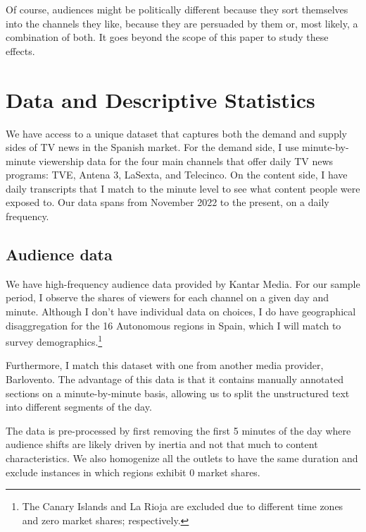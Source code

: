\documentclass[12pt]{article}
\begin{document}
	
	
	Of course, audiences might be politically different because they sort themselves into the channels they like, because they are persuaded by them or, most likely, a combination of both. It goes beyond the scope of this paper to study these effects. 
	
	
	
	
	
	\section{Data and Descriptive Statistics}
	
	\label{section:data}
	
	We have access to a unique dataset that captures both the demand and supply sides of TV news in the Spanish market. For the demand side, I use minute-by-minute viewership data for the four main channels that offer daily TV news programs: TVE, Antena 3, LaSexta, and Telecinco. On the content side, I have daily transcripts that I match to the minute level to see what content people were exposed to. Our data spans from November 2022 to the present, on a daily frequency.
	
	
	
	\subsection*{Audience data }
	
	
	We have high-frequency audience data provided by Kantar Media. For our sample period, I  observe the shares of viewers for each channel on a given day and minute. Although I don't have individual data on choices, I do have geographical disaggregation for the 16 Autonomous regions in Spain, which I will match to survey demographics.\footnote{The Canary Islands and La Rioja are excluded due to different time zones and zero market shares; respectively.}
	
	Furthermore, I match this dataset with one from another media provider, Barlovento. The advantage of this data is that it contains manually annotated sections on a minute-by-minute basis, allowing us to split the unstructured text into different segments of the day. 
	
	The data is pre-processed by first removing the first 5 minutes of the day where audience shifts are likely driven by inertia and not that much to content characteristics. We also homogenize all the outlets to have the same duration and exclude instances in which regions exhibit 0 market shares. 
	
\end{document}
